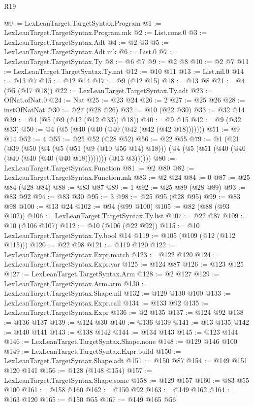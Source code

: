 \begin{lexlean}{R19}
\begin{coremodule}
@0 := LexLeanTarget.TargetSyntax.Program
@1 := LexLeanTarget.TargetSyntax.Program.mk
@2 := List.cons.{0}
@3 := LexLeanTarget.TargetSyntax.Adt
@4 := @2 @3
@5 := LexLeanTarget.TargetSyntax.Adt.mk
@6 := List.{0}
@7 := LexLeanTarget.TargetSyntax.Ty
@8 := @6 @7
@9 := @2 @8
@10 := @2 @7
@11 := LexLeanTarget.TargetSyntax.Ty.nat
@12 := @10 @11
@13 := List.nil.{0}
@14 := @13 @7
@15 := @12 @14
@17 := @9 (@12 @15)
@18 := @13 @8
@21 := @4 (@5 (@17 @18))
@22 := LexLeanTarget.TargetSyntax.Ty.adt
@23 := OfNat.ofNat.{0}
@24 := Nat
@25 := @23 @24
@26 := 2
@27 := @25 @26
@28 := instOfNatNat
@30 := @27 (@28 @26)
@32 := @10 (@22 @30)
@33 := @32 @14
@39 := @4 (@5 (@9 (@12 (@12 @33)) @18))
@40 := @9 @15
@42 := @9 (@32 @33)
@50 := @4 (@5 (@40 (@40 (@40 (@42 (@42 (@42 @18)))))))
@51 := @9 @14
@52 := 4
@55 := @25 @52 (@28 @52)
@56 := @22 @55
@79 := @1
    (@21
      (@39
        (@50
          (@4
            (@5 (@51 (@9 (@10 @56 @14) @18)))
            (@4 (@5 (@51 (@40 (@40 (@40 (@40 (@40 (@40 @18)))))))) (@13 @3))))))
@80 := LexLeanTarget.TargetSyntax.Function
@81 := @2 @80
@82 := LexLeanTarget.TargetSyntax.Function.mk
@83 := @2 @24
@84 := 0
@87 := @25 @84 (@28 @84)
@88 := @83 @87
@89 := 1
@92 := @25 @89 (@28 @89)
@93 := @83 @92
@94 := @83 @30
@95 := 3
@98 := @25 @95 (@28 @95)
@99 := @83 @98
@100 := @13 @24
@102 := @94 (@99 @100)
@105 := @82 (@88 (@93 @102))
@106 := LexLeanTarget.TargetSyntax.Ty.list
@107 := @22 @87
@109 := @10 (@106 @107)
@112 := @10 (@106 (@22 @92))
@115 := @10 LexLeanTarget.TargetSyntax.Ty.bool @14
@119 := @105 (@109 (@12 (@112 @115)))
@120 := @22 @98
@121 := @119 @120
@122 := LexLeanTarget.TargetSyntax.Expr.match
@123 := @122 @120
@124 := LexLeanTarget.TargetSyntax.Expr.var
@125 := @124 @87
@126 := @123 @125
@127 := LexLeanTarget.TargetSyntax.Arm
@128 := @2 @127
@129 := LexLeanTarget.TargetSyntax.Arm.arm
@130 := LexLeanTarget.TargetSyntax.Shape.nil
@132 := @129 @130 @100
@133 := LexLeanTarget.TargetSyntax.Expr.call
@134 := @133 @92
@135 := LexLeanTarget.TargetSyntax.Expr
@136 := @2 @135
@137 := @124 @92
@138 := @136 @137
@139 := @124 @30
@140 := @136 @139
@141 := @13 @135
@142 := @140 @141
@143 := @138 @142
@144 := @134 @143
@145 := @123 @144
@146 := LexLeanTarget.TargetSyntax.Shape.none
@148 := @129 @146 @100
@149 := LexLeanTarget.TargetSyntax.Expr.build
@150 := LexLeanTarget.TargetSyntax.Shape.adt
@151 := @150 @87
@154 := @149 @151 @120 @141
@156 := @128 (@148 @154)
@157 := LexLeanTarget.TargetSyntax.Shape.some
@158 := @129 @157
@160 := @83 @55 @100
@161 := @158 @160
@162 := @150 @92
@163 := @149 @162
@164 := @163 @120
@165 := @150 @55
@167 := @149 @165 @56

\end{coremodule}
\end{lexlean}
